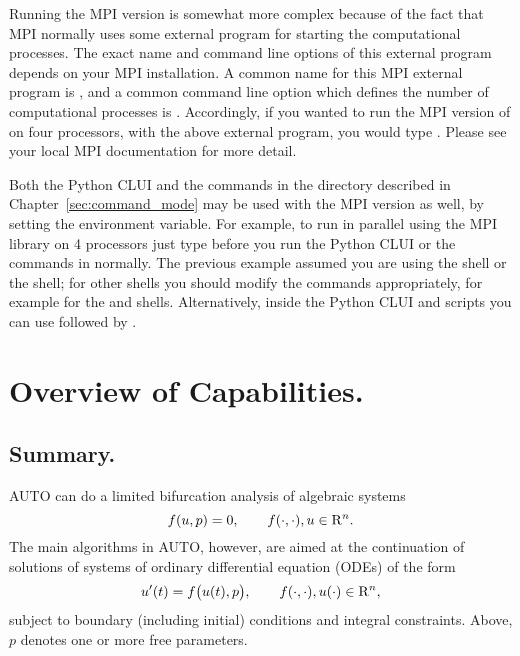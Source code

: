 \documentclass[12pt]{report}
\def\Rn{{\rm R}^n}
\begin{document}
Running the MPI version is somewhat more complex because of the fact
that MPI normally uses some external program for starting the
computational processes.  The exact name and command line options of
this external program depends on your MPI installation.  A common name
for this MPI external program is , and a common command
line option which defines the number of computational processes is .  Accordingly, if you wanted to run the MPI version of \AUTO
on four processors, with the above external program, you would
type .  Please see your local MPI
documentation for more detail.

Both the Python CLUI and the commands in the 
directory described in Chapter~\ref{sec:command_mode} may be used with the
MPI version as well, by setting the 
environment variable.  For example, to run \AUTO in parallel using
the MPI library on 4 processors just type
before you run the Python CLUI  or
the commands in  normally. 
The previous example
assumed you are using the  shell or the  shell; for
other shells you should modify the commands appropriately,
for example 
for the  and  shells. Alternatively,
inside the Python
CLUI and scripts you can use  followed by
.

\chapter{ Overview of Capabilities.} \label{ch:Overview}
\section{ Summary.} \label{sec:Summary}
{\cal AUTO} can do a limited bifurcation analysis of algebraic systems
\begin{equation} \label{1} 
  f( u , p ) = 0 ,  \qquad  f(\cdot,\cdot) , u \in \Rn.
\end{equation}
The main algorithms in {\cal AUTO}, however, are aimed at the continuation
of solutions of systems of ordinary differential equation (ODEs) of the form
\begin{equation} \label{2} 
 u'(t) = f\bigl( u(t) , p \bigr) , 
  \qquad  f(\cdot,\cdot) , u(\cdot) \in \Rn,
\end{equation}
subject to boundary (including initial) conditions and integral constraints.
Above, $p$ denotes one or more free parameters.
\end{document}
